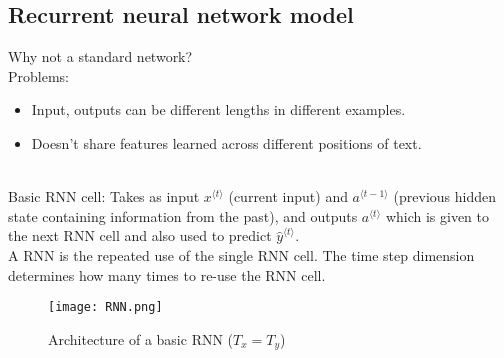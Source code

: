 \subsection{Recurrent neural network model}
Why not a standard network?\\
Problems:
\begin{itemize}
\item
Input, outputs can be different lengths in different examples.
\item
Doesn't share features learned across different positions of text.
\end{itemize}
~\\
Basic RNN cell: Takes as input $x^{\langle t \rangle} $ (current input) and $a^{\langle t-1 \rangle}$ (previous hidden state containing information from the past), and outputs $a^{\langle t \rangle}$ which is given to the next RNN cell and also used to predict $\hat{y}^{\langle t \rangle}$.\\
A RNN is the repeated use of the single RNN cell. The time step dimension determines how many times to re-use the RNN cell.
\begin{figure}[h]
    \centering
    \texttt{[image: RNN.png]}
    \caption{Architecture of a basic RNN ($T_x = T_y$)}
    \label{fig:basicRNN}
\end{figure}

